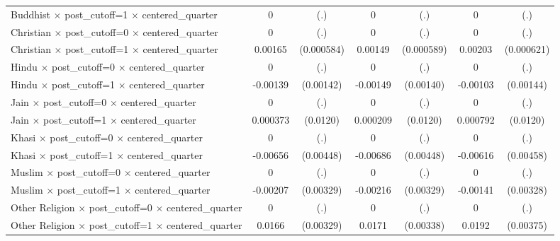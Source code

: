 \begin{table}[htbp]
\begin{tabular}{l*{3}{cc}}
Buddhist $\times$ post\_cutoff=1 $\times$ centered\_quarter&           0         &         (.)&           0         &         (.)&           0         &         (.)\\
Christian $\times$ post\_cutoff=0 $\times$ centered\_quarter&           0         &         (.)&           0         &         (.)&           0         &         (.)\\
Christian $\times$ post\_cutoff=1 $\times$ centered\_quarter&     0.00165\sym{**} &  (0.000584)&     0.00149\sym{*}  &  (0.000589)&     0.00203\sym{**} &  (0.000621)\\
Hindu $\times$ post\_cutoff=0 $\times$ centered\_quarter&           0         &         (.)&           0         &         (.)&           0         &         (.)\\
Hindu $\times$ post\_cutoff=1 $\times$ centered\_quarter&    -0.00139         &   (0.00142)&    -0.00149         &   (0.00140)&    -0.00103         &   (0.00144)\\
Jain $\times$ post\_cutoff=0 $\times$ centered\_quarter&           0         &         (.)&           0         &         (.)&           0         &         (.)\\
Jain $\times$ post\_cutoff=1 $\times$ centered\_quarter&    0.000373         &    (0.0120)&    0.000209         &    (0.0120)&    0.000792         &    (0.0120)\\
Khasi $\times$ post\_cutoff=0 $\times$ centered\_quarter&           0         &         (.)&           0         &         (.)&           0         &         (.)\\
Khasi $\times$ post\_cutoff=1 $\times$ centered\_quarter&    -0.00656         &   (0.00448)&    -0.00686         &   (0.00448)&    -0.00616         &   (0.00458)\\
Muslim $\times$ post\_cutoff=0 $\times$ centered\_quarter&           0         &         (.)&           0         &         (.)&           0         &         (.)\\
Muslim $\times$ post\_cutoff=1 $\times$ centered\_quarter&    -0.00207         &   (0.00329)&    -0.00216         &   (0.00329)&    -0.00141         &   (0.00328)\\
Other Religion $\times$ post\_cutoff=0 $\times$ centered\_quarter&           0         &         (.)&           0         &         (.)&           0         &         (.)\\
Other Religion $\times$ post\_cutoff=1 $\times$ centered\_quarter&      0.0166\sym{***}&   (0.00329)&      0.0171\sym{***}&   (0.00338)&      0.0192\sym{***}&   (0.00375)\\

\end{tabular}
\end{table}
